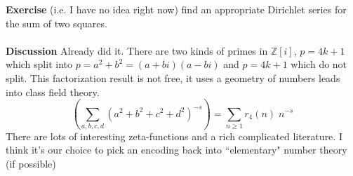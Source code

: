 \documentclass[12pt]{article}
\begin{document}
\textbf{Exercise} (i.e. I have no idea right now) find an appropriate Dirichlet series for the sum of two squares. \\ \\
\textbf{Discussion} Already did it.  There are two kinds of primes in $\mathbb{Z}[i]$, $p = 4k+1$ which split into $p = a^2 + b^2 = (a+bi)(a-bi) $ and $p = 4k+1$ which do not split.  This factorization result is not free, it uses a {\color{red!60!white}geometry of numbers} leads into {\color{blue}class field theory}.  
$$ \left( \sum_{a,b,c,d} (a^2+ b^2 + c^2 + d^2)^{-s} \right) =  \sum_{n \geq 1} r_4(n) \; n^{-s}  $$
There are lots of interesting zeta-functions and a rich complicated literature. I think it's our choice to pick an encoding back into ``elementary" number theory (if possible)

\newpage
\end{document}
